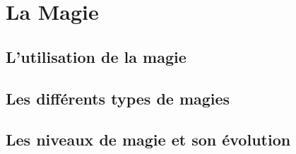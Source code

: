 \chapter{La Magie}

\section{L'utilisation de la magie}

\section{Les différents types de magies}

\section{Les niveaux de magie et son évolution}